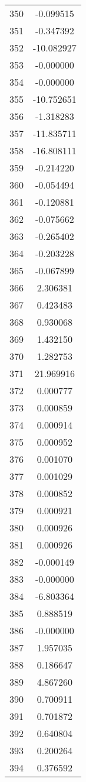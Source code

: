 \documentclass[12pt]{article}
\begin{document}
\begin{longtable}{@{}cc@{}}
350 & -0.099515 \\
351 & -0.347392 \\
352 & -10.082927 \\
353 & -0.000000 \\
354 & -0.000000 \\
355 & -10.752651 \\
356 & -1.318283 \\
357 & -11.835711 \\
358 & -16.808111 \\
359 & -0.214220 \\
360 & -0.054494 \\
361 & -0.120881 \\
362 & -0.075662 \\
363 & -0.265402 \\
364 & -0.203228 \\
365 & -0.067899 \\
366 & 2.306381 \\
367 & 0.423483 \\
368 & 0.930068 \\
369 & 1.432150 \\
370 & 1.282753 \\
371 & 21.969916 \\
372 & 0.000777 \\
373 & 0.000859 \\
374 & 0.000914 \\
375 & 0.000952 \\
376 & 0.001070 \\
377 & 0.001029 \\
378 & 0.000852 \\
379 & 0.000921 \\
380 & 0.000926 \\
381 & 0.000926 \\
382 & -0.000149 \\
383 & -0.000000 \\
384 & -6.803364 \\
385 & 0.888519 \\
386 & -0.000000 \\
387 & 1.957035 \\
388 & 0.186647 \\
389 & 4.867260 \\
390 & 0.700911 \\
391 & 0.701872 \\
392 & 0.640804 \\
393 & 0.200264 \\
394 & 0.376592 \\

\end{longtable}
\end{document}

